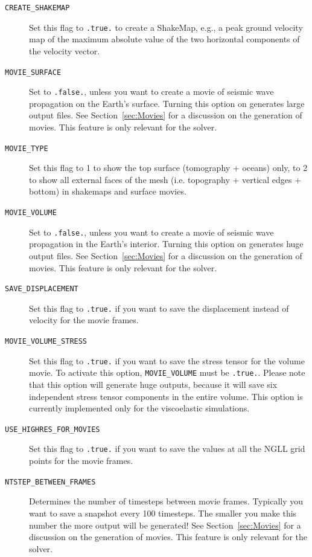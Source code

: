 \vspace{1cm}
\begin{description}
\item [{\texttt{CREATE\_SHAKEMAP}}] Set this flag to \texttt{.true.} to
create a ShakeMap\textregistered{}, e.g., a peak ground velocity map
of the maximum absolute value of the two horizontal components of
the velocity vector.
%
\item [{\texttt{MOVIE\_SURFACE}}] Set to \texttt{.false.}, unless you want
to create a movie of seismic wave propagation on the Earth's surface.
Turning this option on generates large output files. See Section~\ref{sec:Movies}
for a discussion on the generation of movies. This feature is only
relevant for the solver.
%
\item [{\texttt{MOVIE\_TYPE}}] Set this flag to 1 to show the top surface
(tomography + oceans) only, to 2 to show all external faces of the
mesh (i.e. topography + vertical edges + bottom) in shakemaps and
surface movies.
%
\item [{\texttt{MOVIE\_VOLUME}}] Set to \texttt{.false.}, unless you want
to create a movie of seismic wave propagation in the Earth's interior.
Turning this option on generates huge output files. See Section~\ref{sec:Movies}
for a discussion on the generation of movies. This feature is only
relevant for the solver.
%
\item [{\texttt{SAVE\_DISPLACEMENT}}] Set this flag to \texttt{.true.}
if you want to save the displacement instead of velocity for the movie
frames.
%
\item [{\texttt{MOVIE\_VOLUME\_STRESS}}] Set this flag to \texttt{.true.}
if you want to save the stress tensor for the volume movie.
To activate this option, \texttt{MOVIE\_VOLUME} must be \texttt{.true.}.
Please note that this option will generate huge outputs, because it will save six independent stress tensor components in the entire volume.
This option is currently implemented only for the viscoelastic simulations.
%
\item [{\texttt{USE\_HIGHRES\_FOR\_MOVIES}}] Set this flag to \texttt{.true.}
if you want to save the values at all the NGLL grid points for the
movie frames.
%
\item [{\texttt{NTSTEP\_BETWEEN\_FRAMES}}] Determines the number of timesteps
between movie frames. Typically you want to save a snapshot every
100 timesteps. The smaller you make this number the more output will
be generated! See Section~\ref{sec:Movies} for a discussion on the
generation of movies. This feature is only relevant for the solver.

\end{description}
